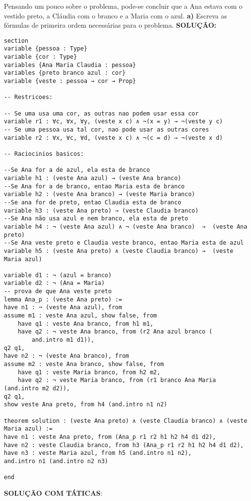 \newline Pensando um pouco sobre o problema, pode-se concluir que a Ana estava
com o vestido preto, a Cláudia com o branco e a Maria com o
azul.  
\newline \textbf{a)} Escreva as fórmulas de primeira ordem necessárias para o problema.
\newline \textbf{SOLUÇÃO:}
\begin{lstlisting}
section 
variable {pessoa : Type} 
variable {cor : Type}
variables {Ana Maria Claudia : pessoa}
variables {preto branco azul : cor}
variable {veste : pessoa → cor → Prop}

-- Restricoes:

-- Se uma usa uma cor, as outras nao podem usar essa cor
variable r1 : ∀c, ∀x, ∀y, (veste x c) ∧ ¬(x = y) → ¬(veste y c)
-- Se uma pessoa usa tal cor, nao pode usar as outras cores
variable r2 : ∀x, ∀c, ∀d, (veste x c) ∧ ¬(c = d) → ¬(veste x d)

-- Raciocinios basicos:

--Se Ana for a de azul, ela esta de branco
variable h1 : (veste Ana azul) → (veste Ana branco)
--Se Ana for a de branco, entao Maria esta de branco
variable h2 : (veste Ana branco) → (veste Maria branco)
--Se ana for de preto, entao Claudia esta de branco
variable h3 : (veste Ana preto) → (veste Claudia branco)
--Se Ana não usa azul e nem branco, ela esta de preto
variable h4 : ¬ (veste Ana azul) ∧ ¬ (veste Ana branco)  →  (veste Ana preto)
--Se Ana veste preto e Claudia veste branco, entao Maria esta de azul
variable h5 : (veste Ana preto) ∧ (veste Claudia branco) →  (veste Maria azul)

variable d1 : ¬ (azul = branco)
variable d2 : ¬ (Ana = Maria)
-- prova de que Ana veste preto
lemma Ana_p : (veste Ana preto) :=
have n1 : ¬ (veste Ana azul), from 
assume m1 : veste Ana azul, show false, from 
    have q1 : veste Ana branco, from h1 m1,
    have q2 : ¬ veste Ana branco, from (r2 Ana azul branco (
        and.intro m1 d1)),
q2 q1,
have n2 : ¬ (veste Ana branco), from
assume m2 : veste Ana branco, show false, from
    have q1 : veste Maria branco, from h2 m2,
    have q2 : ¬ veste Maria branco, from (r1 branco Ana Maria (and.intro m2 d2)),
q2 q1,
show veste Ana preto, from h4 (and.intro n1 n2)

theorem solution : (veste Ana preto) ∧ (veste Claudia branco) ∧ (veste Maria azul) :=
have n1 : veste Ana preto, from (Ana_p r1 r2 h1 h2 h4 d1 d2),
have n2 : veste Claudia branco, from h3 (Ana_p r1 r2 h1 h2 h4 d1 d2),
have n3 : veste Maria azul, from h5 (and.intro n1 n2),
and.intro n1 (and.intro n2 n3)

end
\end{lstlisting}
\textbf{SOLUÇÃO COM TÁTICAS}:
\begin{lstlisting}
    
\end{lstlisting}